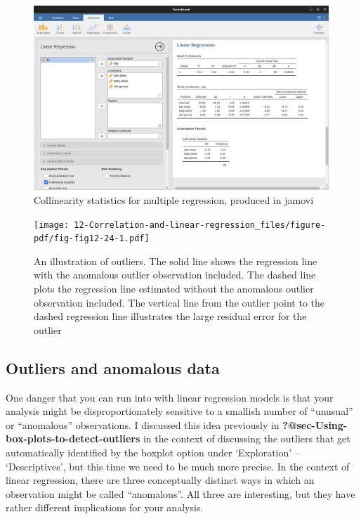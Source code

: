 \documentclass[
  a4paper,
]{book}
\begin{document}
\begin{figure}[h!]

\includegraphics[width=0.99\textwidth,height=\textheight]{images/fig12-23.png} \hfill{}

\caption{\label{fig-fig12-23}Collinearity statistics for multiple
regression, produced in jamovi}

\end{figure}

\begin{figure}[h!]

\texttt{[image: 12-Correlation-and-linear-regression\_files/figure-pdf/fig-fig12-24-1.pdf]} \hfill{}

\caption{\label{fig-fig12-24}An illustration of outliers. The solid line
shows the regression line with the anomalous outlier observation
included. The dashed line plots the regression line estimated without
the anomalous outlier observation included. The vertical line from the
outlier point to the dashed regression line illustrates the large
residual error for the outlier}

\end{figure}

\hypertarget{outliers-and-anomalous-data}{%
\subsection{Outliers and anomalous
data}\label{outliers-and-anomalous-data}}

One danger that you can run into with linear regression models is that
your analysis might be disproportionately sensitive to a smallish number
of ``unusual'' or ``anomalous'' observations. I discussed this idea
previously in \textbf{?@sec-Using-box-plots-to-detect-outliers} in the
context of discussing the outliers that get automatically identified by
the boxplot option under `Exploration' -- `Descriptives', but this time
we need to be much more precise. In the context of linear regression,
there are three conceptually distinct ways in which an observation might
be called ``anomalous''. All three are interesting, but they have rather
different implications for your analysis.
\end{document}
